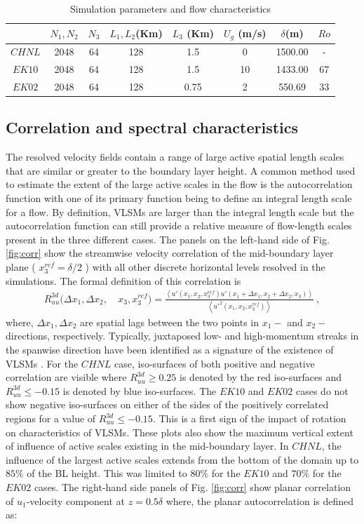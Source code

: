 \documentclass{svjour3}                     %
\begin{document}
\begin{table}[ht]
\caption{Simulation parameters and flow characteristics}
  \begin{tabular}{ c c c  c c c c  c }
  \hline 
   & $N_1, N_2$ & $N_3$ & $L_1, L_2$(Km) & $L_3$ (Km) & $U_g$ (m/s)  & $\delta$(m) & $Ro$ \\
  \hline  
   $CHNL$ & 2048 &  64 & 128 &  1.5  &  0    & 1500.00 & - \\
   $EK10$ & 2048 &  64 & 128 &  1.5  &  10   & 1433.00 & 67  \\
   $EK02$ & 2048 &  64 & 128 &  0.75 & 2     & 550.69  & 33  \\
  \hline 
  \hline 
\end{tabular}
\label{tab:sim_param}
\end{table}
\subsection{Correlation and spectral characteristics}
The resolved velocity fields contain a  range of large active spatial length scales that are similar or greater to the boundary layer height. A common method used to estimate the extent of the large active scales in the flow is the autocorrelation function with one of its primary function being to define an integral length scale for a flow. By definition, VLSMs are larger than the integral length scale but the autocorrelation function can still provide a relative measure of flow-length scales present in the three different cases. The panels on the left-hand side of Fig. \ref{fig:corr} show the streamwise velocity correlation of the mid-boundary layer plane ( $x_3^{ref}=\delta/2$ ) with all other discrete horizontal levels resolved in the simulations. The formal definition of this correlation is 
\begin{align}
 R_{uu}^{3d}(\Delta x_1, \Delta x_2,\ & x_3, x_3^{ref})   =   \frac{\left < u'(x_1, x_2, x_3^{ref})u'(x_1 + \Delta x_1, x_2 + \Delta x_2, x_3) \right >}{\left < u'^{2}(x_1,x_2,x_3^{ref})\right >} \ ,
\label{eqn:3d_corr} 
\end{align}
where, $\Delta x_1, \Delta x_2$ are spatial lags between the two points in $x_1-$ and $x_2-$directions, respectively. Typically,  juxtaposed low- and high-momentum streaks  in the spanwise direction have been identified as a signature of the existence of VLSMs \citep{fang2015blm}. For the $CHNL$ case, iso-surfaces of both positive and negative correlation are visible where $R_{uu}^{3d}\geq 0.25$ is denoted by the red iso-surfaces and $R_{uu}^{3d}\leq -0.15$ is denoted by blue iso-surfaces. The $EK10$ and $EK02$ cases do not show negative iso-surfaces on either of the sides of the positively correlated regions for a value of $R_{uu}^{3d}\leq -0.15$. This is a  first sign of the impact of rotation on characteristics of VLSMs. These plots also show the maximum vertical extent of influence of active scales existing in the mid-boundary layer. In $CHNL$, the influence of the largest active scales extends from the bottom of the domain up to   $85\%$ of the BL height. This was limited to $80\%$ for the $EK10$ and $70\%$ for the $EK02$ cases.  The right-hand side panels of Fig. \ref{fig:corr} show planar correlation of $u_1$-velocity component at $ z=0.5\delta$ where, the planar autocorrelation is defined as: 
\end{document}
